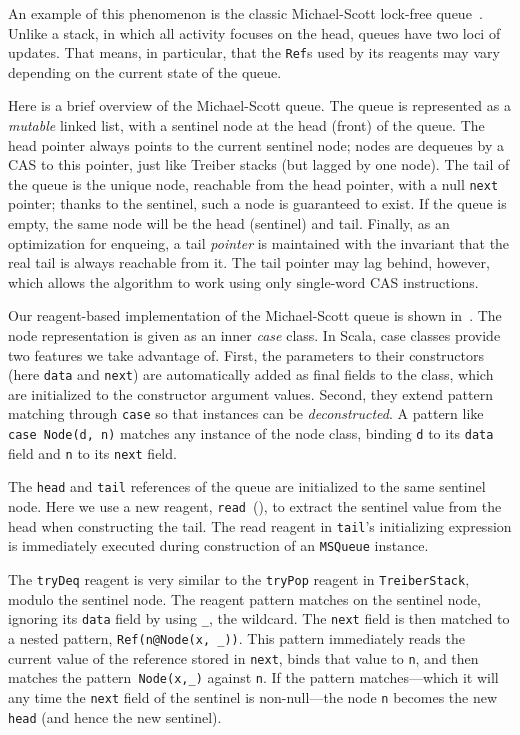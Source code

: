\documentclass[preprint,nocopyrightspace]{sigplanconf}
\begin{document}
An example of this phenomenon is the classic Michael-Scott lock-free
queue~\cite{Michael1996}.  Unlike a stack, in which all activity focuses on
the head, queues have two loci of updates.  That means, in particular, that
the \lstinline{Ref}s used by its reagents may vary depending on the current
state of the queue.

Here is a brief overview of the Michael-Scott queue.  The queue is represented
as a \emph{mutable} linked list, with a sentinel node at the head (front) of
the queue.  The head pointer always points to the current sentinel node; nodes
are dequeues by a CAS to this pointer, just like Treiber stacks (but lagged by
one node).  The tail of the queue is the unique node, reachable from the head
pointer, with a null \lstinline{next} pointer; thanks to the sentinel, such a
node is guaranteed to exist.  If the queue is empty, the same node will be the
head (sentinel) and tail.  Finally, as an optimization for enqueing, a tail
\emph{pointer} is maintained with the invariant that the real tail is always
reachable from it.  The tail pointer may lag behind, however, which allows the
algorithm to work using only single-word CAS instructions.

Our reagent-based implementation of the Michael-Scott queue is shown
in~.  The node representation is given as an inner \emph{case}
class.  In Scala, case classes provide two features we take advantage of.
First, the parameters to their constructors (here \lstinline{data} and
\lstinline{next}) are automatically added as final fields to the class, which
are initialized to the constructor argument values.  Second, they extend
pattern matching through \lstinline{case} so that instances can be
\emph{deconstructed}.  A pattern like \lstinline{case Node(d, n)} matches any
instance of the node class, binding \lstinline{d} to its \lstinline{data}
field and \lstinline{n} to its \lstinline{next} field.

The \lstinline{head} and \lstinline{tail} references of the queue are
initialized to the same sentinel node.  Here we use a new reagent,
\lstinline{read}~(), to extract the sentinel value from
the head when constructing the tail.  The read reagent in \lstinline{tail}'s
initializing expression is immediately executed during construction of an
\lstinline{MSQueue} instance.

The \lstinline{tryDeq} reagent is very similar to the \lstinline{tryPop}
reagent in \lstinline{TreiberStack}, modulo the sentinel node.  The reagent
pattern matches on the sentinel node, ignoring its \lstinline{data} field by
using \lstinline{_}, the wildcard.  The \lstinline{next} field is then matched
to a nested pattern, \lstinline{Ref(n@Node(x, _))}.  This pattern immediately
reads the current value of the reference stored in \lstinline{next}, binds
that value to \lstinline{n}, and then matches the
pattern~\lstinline{Node(x,_)} against \lstinline{n}.  If the pattern
matches---which it will any time the \lstinline{next} field of the sentinel is
non-null---the node \lstinline{n} becomes the new \lstinline{head} (and hence
the new sentinel).  
\end{document}
